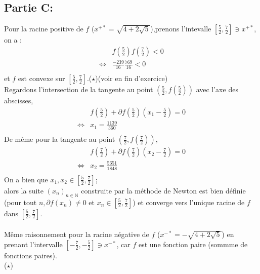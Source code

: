 \documentclass[a4paper, 12pt]{article}
\begin{document}
\subsection{Partie C:}
Pour la racine positive de $f$ ($x^{+*}=\sqrt{4+2\sqrt{5}}$),prenons l'intevalle $[\frac{5}{2},\frac{7}{2}]\ni x^{+*}$,\\
on a :
\begin{align*}
&f(\frac{5}{2})f(\frac{7}{2})<0 \\
\Leftrightarrow&\frac{-239}{16}\frac{769}{16}<0\\
\end{align*}
et $f$ est convexe sur $[\frac{5}{2},\frac{7}{2}]$.($\star$)(voir en fin d'exercice)\\
Regardons l'intersection de la tangente au point $(\frac{5}{2},f(\frac{5}{2}))$ avec l'axe des abscisses,\\
\begin{align*}
&f(\frac{5}{2})+\partial f(\frac{5}{2})(x_1-\frac{5}{2})=0\\
\Leftrightarrow& x_1=\frac{1139}{360}\\
\end{align*}
De même pour la tangente au point $(\frac{7}{2},f(\frac{7}{2}))$,\\
\begin{align*}
&f(\frac{7}{2})+\partial f(\frac{7}{2})(x_2-\frac{7}{2})=0\\
\Leftrightarrow& x_2=\frac{5651}{1848}\\
\end{align*}
On a bien que $x_1,x_2\in[\frac{5}{2},\frac{7}{2}]$;\\
alors la suite $(x_n)_{n\in\mathbb{N}}$ construite par la méthode de Newton est bien définie (pour tout $n , \partial f(x_n)\neq 0$ et $x_n\in [\frac{5}{2},\frac{7}{2}]$) et converge vers l'unique racine de $f$ dans $[\frac{5}{2},\frac{7}{2}]$.\\
\\
Même raisonnement pour la racine négative de $f$ ($x^{-*}=-\sqrt{4+2\sqrt{5}}$) en prenant l'intervalle $[-\frac{7}{2},-\frac{5}{2}]\ni x^{-*}$, car $f$ est une fonction paire (sommme de fonctions paires).\\[10mm]($\star$)
\end{document}
